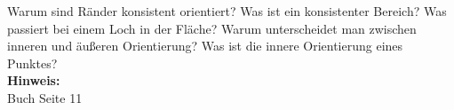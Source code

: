 \begin{question}[section=1,subsection=12,name={Orientierungen},difficulty=2,type=mdl,tags={}]
	Warum sind Ränder konsistent orientiert? Was ist ein konsistenter Bereich? Was passiert bei einem Loch in der Fläche? Warum unterscheidet man zwischen inneren und äußeren Orientierung? Was ist die innere Orientierung eines Punktes?
	\\ \textbf{Hinweis:}\\
	Buch Seite 11
\end{question}
\begin{solution}
	
\end{solution}